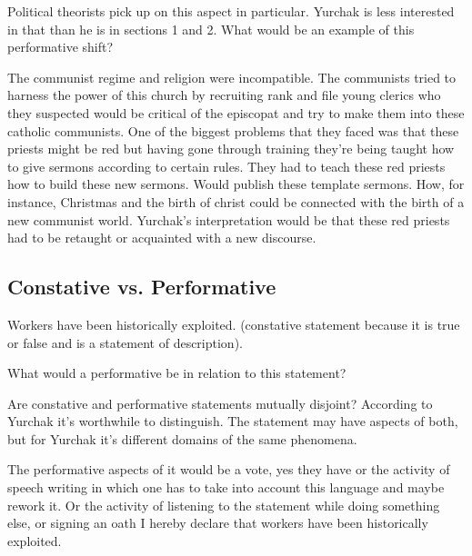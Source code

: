 \documentclass{article}
\begin{document}
\vspace{3mm}

Political theorists pick up on this aspect in particular.  Yurchak is less interested in that than he is in sections 1 and 2.  What would be an example of this performative shift?  

\vspace{3mm}

The communist regime and religion were incompatible.  The communists tried to harness the power of this church by recruiting rank and file young clerics who they suspected would be critical of the episcopat and try to make them into these catholic communists.  One of the biggest problems that they faced was that these priests might be red but having gone through training they're being taught how to give sermons according to certain rules.  They had to teach these red priests how to build these new sermons.  Would publish these template sermons.  How, for instance, Christmas and the birth of christ could be connected with the birth of a new communist world.  Yurchak's interpretation would be that these red priests had to be retaught or acquainted with a new discourse.  

\subsection{Constative vs. Performative}

Workers have been historically exploited.  (constative statement because it is true or false and is a statement of description).  

\vspace{3mm}

What would a performative be in relation to this statement?  

\vspace{3mm}

Are constative and performative statements mutually disjoint?  According to Yurchak it's worthwhile to distinguish.  The statement may have aspects of both, but for Yurchak it's different domains of the same phenomena.  

\vspace{3mm}

The performative aspects of it would be a vote, yes they have or the activity of speech writing in which one has to take into account this language and maybe rework it.  Or the activity of listening to the statement while doing something else, or signing an oath I hereby declare that workers have been historically exploited.  
\end{document}

